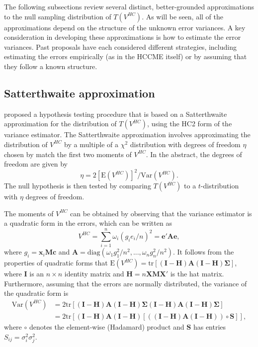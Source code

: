 \documentclass[12pt]{article}\usepackage[]{graphicx}\usepackage[]{color}
\newcommand{\E}{\text{E}}
\newcommand{\Var}{\text{Var}}
\newcommand{\tr}{\text{tr}}
\newcommand{\diag}{\text{diag}}
\newcommand{\bm}{\mathbf}
\newcommand{\bs}{\boldsymbol}
\begin{document}
The following subsections review several distinct, better-grounded approximations to the null sampling distribution of $T\left(V^{HC}\right)$. As will be seen, all of the approximations depend on the structure of the unknown error variances. A key consideration in developing these approximations is how to estimate the error variances. Past proposals have each considered different strategies, including estimating the errors empirically (as in the HCCME itself) or by assuming that they follow a known structure. 

\subsection{Satterthwaite approximation} 

\citet{Lipsitz1999degrees} proposed a hypothesis testing procedure that is based on a Satterthwaite approximation for the distribution of $T\left(V^{HC}\right)$, using the HC2 form of the variance estimator. The Satterthwaite approximation involves approximating the distribution of $V^{HC}$ by a multiple of a $\chi^2$ distribution with degrees of freedom $\eta$ chosen by match the first two moments of $V^{HC}$. In the abstract, the degrees of freedom are given by 
\[
\eta = 2 \left[\E\left(V^{HC}\right)\right]^2 / \Var\left(V^{HC}\right).
\]
The null hypothesis is then tested by comparing $T\left(V^{HC}\right)$ to a $t$-distribution with $\eta$ degrees of freedom. 

The moments of $V^{HC}$ can be obtained by observing that the variance estimator is a quadratic form in the errors, which can be written as \[
V^{HC} = \sum_{i=1}^n \omega_i \left(g_i e_i / n \right)^2 = \bm{e}' \bm{A} \bm{e}, \]
where $g_i = \bm{x}_i \bm{M} \bm{c}$ and $\bm{A} = \diag\left(\omega_1 g_1^2 / n^2,...,\omega_n g_n^2 / n^2\right)$. It follows from the properties of quadratic forms that $\E\left(V^{HC}\right) = \tr\left[\left(\bm{I} - \bm{H}\right)\bm{A}\left(\bm{I} - \bm{H}\right)\bs\Sigma\right]$, where $\bm{I}$ is an $n \times n$ identity matrix and $\bm{H} = n\bm{X}\bm{M}\bm{X}'$ is the hat matrix. Furthermore, assuming that the errors are normally distributed, the variance of the quadratic form is
\begin{align*}
\Var\left(V^{HC}\right) &= 2\tr\left[\left(\bm{I} - \bm{H}\right)\bm{A}\left(\bm{I} - \bm{H}\right)\bs\Sigma\left(\bm{I} - \bm{H}\right)\bm{A}\left(\bm{I} - \bm{H}\right)\bs\Sigma\right] \\
&= 2\tr\left[\left(\bm{I} - \bm{H}\right)\bm{A}\left(\bm{I} - \bm{H}\right)\left[\left(\left(\bm{I} - \bm{H}\right)\bm{A}\left(\bm{I} - \bm{H}\right)\right)\circ \bm{S}\right]\right], 
\end{align*}
where $\circ$ denotes the element-wise (Hadamard) product and $\bm{S}$ has entries $S_{ij} = \sigma_i^2 \sigma_j^2$. 
\end{document}
